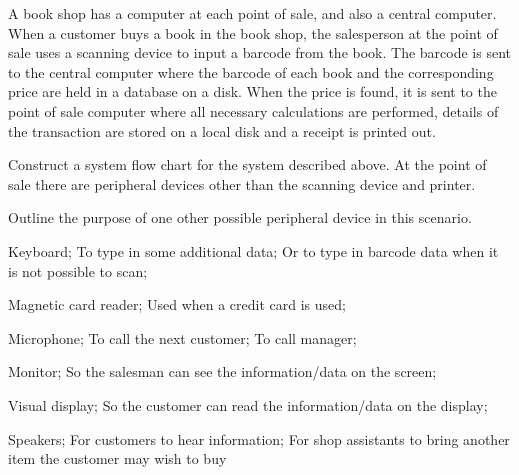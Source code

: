 \begin{exercise*} %
A book shop has a computer at each point of sale, and also a central computer. When a customer buys a book in the book shop, the salesperson at the point of sale uses a scanning device to input a barcode from the book. The barcode is sent to the central computer where the barcode of each book and the corresponding price are held in a database on a disk.
When the price is found, it is sent to the point of sale computer where all necessary calculations are performed, details of the transaction are stored on a local disk and a receipt is printed out.
\begin{parts}
	\item Construct a system flow chart for the system described above.
	\newline
	At the point of sale there are peripheral devices other than the scanning device and printer.
	\item Outline the purpose of one other possible peripheral device in this scenario.
	
\begin{solution}
\newline
Keyboard;
To type in some additional data;
Or to type in barcode data when it is not possible to scan;

Magnetic card reader;
Used when a credit card is used;

Microphone;
To call the next customer;
To call manager;

Monitor;
So the salesman can see the information/data on the screen;

Visual display;
So the customer can read the information/data on the display;

Speakers;
For customers to hear information;
For shop assistants to bring another item the customer may wish to buy
\end{solution}
\end{parts}
\end{exercise*}	
	